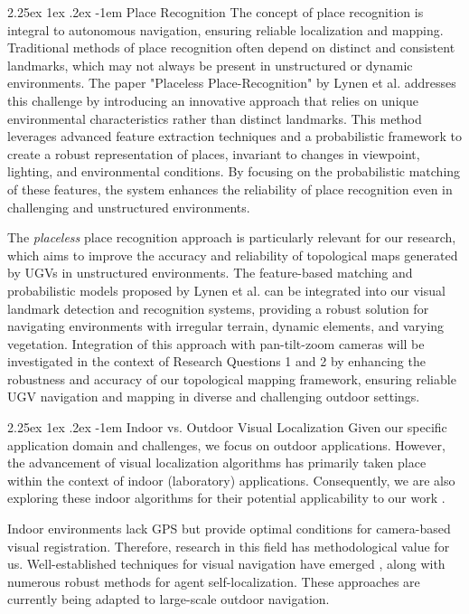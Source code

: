 \documentclass[runningheads]{llncs}
\makeatletter
\renewcommand\paragraph{\@startsection{paragraph}{4}{\z@}%
                                    {2.25ex \@plus1ex \@minus.2ex}%
                                    {-1em}%
                                    {\normalfont\normalsize\bfseries}}
\makeatother
\begin{document}
\paragraph{Place Recognition}
The concept of place recognition is integral to autonomous navigation, ensuring reliable localization and mapping. Traditional methods of place recognition often depend on distinct and consistent landmarks, which may not always be present in unstructured or dynamic environments. The paper "Placeless Place-Recognition" by Lynen et al. \cite{PlacePlaceRecognition} addresses this challenge by introducing an innovative approach that relies on unique environmental characteristics rather than distinct landmarks. This method leverages advanced feature extraction techniques and a probabilistic framework to create a robust representation of places, invariant to changes in viewpoint, lighting, and environmental conditions. By focusing on the probabilistic matching of these features, the system enhances the reliability of place recognition even in challenging and unstructured environments.

The \textit{placeless} place recognition approach is particularly relevant for our research, which aims to improve the accuracy and reliability of topological maps generated by UGVs in unstructured environments. The feature-based matching and probabilistic models proposed by Lynen et al. can be integrated into our visual landmark detection and recognition systems, providing a robust solution for navigating environments with irregular terrain, dynamic elements, and varying vegetation. Integration of this approach with pan-tilt-zoom cameras will be investigated in the context of Research Questions 1 and 2 by enhancing the robustness and accuracy of our topological mapping framework, ensuring reliable UGV navigation and mapping in diverse and challenging outdoor settings.

\paragraph{Indoor vs. Outdoor Visual Localization}
Given our specific application domain and challenges, we focus on outdoor applications. However, the advancement of visual localization algorithms has primarily taken place within the context of indoor (laboratory) applications. Consequently, we are also exploring these indoor algorithms for their potential applicability to our work \cite{IndoorsSparseLandmarks, LandmarksEffectivenessExperiment}.

Indoor environments lack GPS but provide optimal conditions for camera-based visual registration. Therefore, research in this field has methodological value for us. Well-established techniques for visual navigation have emerged \cite{LandmarkGraphBasedIndoorLoc}, along with numerous robust methods for agent self-localization. These approaches are currently being adapted to large-scale outdoor navigation.
\end{document}
